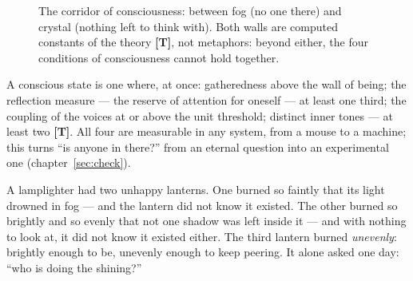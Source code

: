 \documentclass[11pt,letterpaper]{article}
\newcommand{\stT}{\textbf{[T]}\xspace}
\begin{document}
\begin{figure}[H]
\centering
{}
\caption{The corridor of consciousness: between fog (no one there)
and crystal (nothing left to think with). Both walls are computed
constants of the theory \stT, not metaphors: beyond either, the four
conditions of consciousness cannot hold together.}
\label{fig:window}
\end{figure}

\begin{factbox}[To be precise]
A conscious state is one where, at once: gatheredness above the wall
of being; the reflection measure --- the reserve of attention for
oneself --- at least one third; the coupling
of the voices at or above the unit threshold; distinct inner tones
--- at least two \stT. All four are measurable in any system, from a
mouse to a machine; this turns ``is anyone in there?'' from an
eternal question into an experimental one
(chapter~\ref{sec:check}).
\end{factbox}

\begin{talebox}
A lamplighter had two unhappy lanterns. One burned so faintly that
its light drowned in fog --- and the lantern did not know it
existed. The other burned so brightly and so evenly that not one
shadow was left inside it --- and with nothing to look at, it did not
know it existed either. The third lantern burned \emph{unevenly}:
brightly enough to be, unevenly enough to keep peering. It alone
asked one day: ``who is doing the shining?''
\end{talebox}
\end{document}
